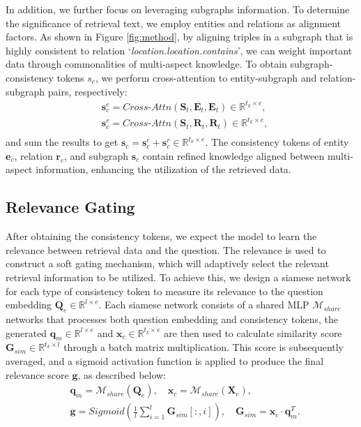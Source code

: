 In addition, we further focus on leveraging subgraphs information. To determine the significance of retrieval text, we employ entities and relations as alignment factors. As shown in Figure \ref{fig:method}, by aligning triples in a subgraph that is highly consistent to relation  `\textit{location.location.contains}', we can weight important data through commonalities of multi-aspect knowledge. To obtain subgraph-consistency tokens $s_{c}$, we perform cross-attention to entity-subgraph and relation-subgraph pairs, respectively:
\begin{equation}
\begin{aligned}
    &\boldsymbol{s}_{c}^{e} = Cross\text{-}Attn(\boldsymbol{S}_{t}, \boldsymbol{E}_{t} ,\boldsymbol{E}_{t}) \in \mathbb{R}^{t_k \times e}, \\
   &\boldsymbol{s}_{c}^{r} = Cross\text{-}Attn(\boldsymbol{S}_{t}, \boldsymbol{R}_{t} ,\boldsymbol{R}_{t}) \in \mathbb{R}^{t_k \times e}, \\
\end{aligned}
\end{equation}
and sum the results to get $\boldsymbol{s}_{c}= \boldsymbol{s}_{c}^{e} + \boldsymbol{s}_{c}^{r} \in \mathbb{R}^{t_k \times e}$. The consistency tokens of entity $\boldsymbol{e}_{c}$, relation $\boldsymbol{r}_{c}$, and subgraph $\boldsymbol{s}_{c}$ contain refined knowledge aligned between multi-aspect information, enhancing the utilization of the retrieved data.

\subsection{Relevance Gating} \label{sec:Relevance Gating}
After obtaining the consistency tokens, we expect the model to learn the relevance between retrieval data and the question.  The relevance is used to construct a soft gating mechanism, which will adaptively select the relevant retrieval information to be utilized.
To achieve this, we design a siamese network for each type of consistency token to measure its relevance to the question embedding $\boldsymbol{Q}_{e} \in \mathbb{R}^{l \times e}$. Each siamese network consists of a shared MLP $\mathcal{M}_{share}$ networks that processes both question embedding and consistency tokens, the generated $\boldsymbol{q}_{m}\in \mathbb{R}^{l \times e}$ and $\boldsymbol{x}_{c}\in \mathbb{R}^{t_k \times e}$ are then used to calculate similarity score $\boldsymbol{G}_{sim} \in \mathbb{R}^{t_k \times l}$ through a batch matrix multiplication. This score is subsequently averaged, and a sigmoid activation function is applied to produce the final relevance score $\boldsymbol{g}$, as described below:
\begin{equation}
\begin{aligned}
    &\boldsymbol{q}_{m} = \mathcal{M}_{share}(\boldsymbol{Q}_{e}), \quad \boldsymbol{x}_{c} = \mathcal{M}_{share}(\boldsymbol{X}_{c}), \\
    & \boldsymbol{g} = Sigmoid(\frac{1}{l}\sum\nolimits_{i=1}^{l} \boldsymbol{G}_{sim}[:,i]),\quad \boldsymbol{G}_{sim} = \boldsymbol{x}_{c} \cdot  \boldsymbol{q}_{m}^T.\\
\end{aligned}
\end{equation}

